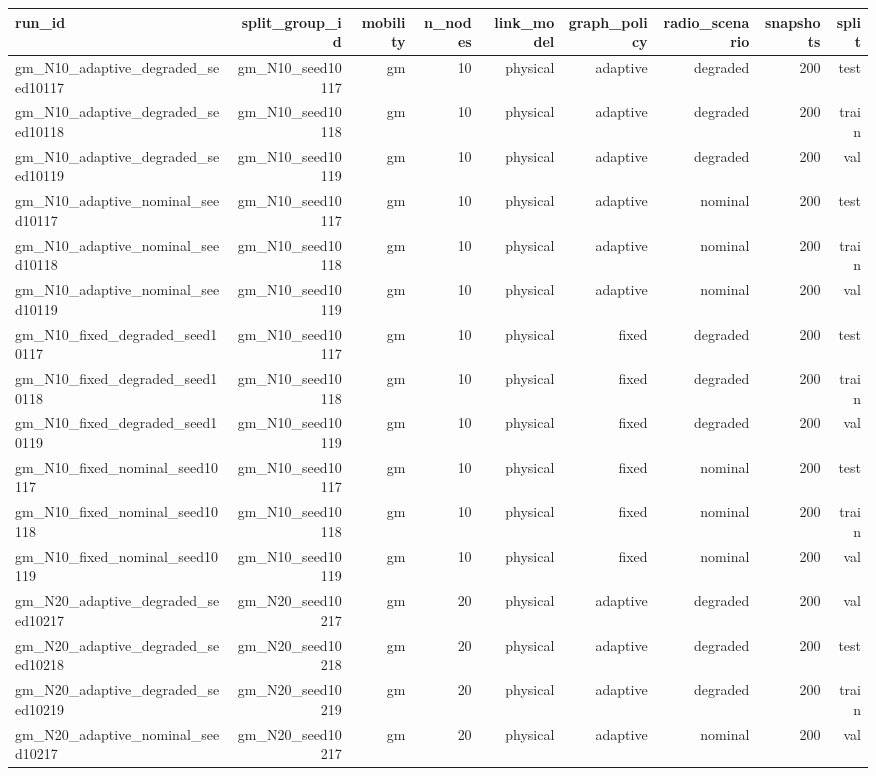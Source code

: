 \begin{tabular}{lrrrrrrrr}
\toprule
run\_id & split\_group\_id & mobility & n\_nodes & link\_model & graph\_policy & radio\_scenario & snapshots & split \\
\midrule
gm\_N10\_adaptive\_degraded\_seed10117 & gm\_N10\_seed10117 & gm & 10 & physical & adaptive & degraded & 200 & test \\
gm\_N10\_adaptive\_degraded\_seed10118 & gm\_N10\_seed10118 & gm & 10 & physical & adaptive & degraded & 200 & train \\
gm\_N10\_adaptive\_degraded\_seed10119 & gm\_N10\_seed10119 & gm & 10 & physical & adaptive & degraded & 200 & val \\
gm\_N10\_adaptive\_nominal\_seed10117 & gm\_N10\_seed10117 & gm & 10 & physical & adaptive & nominal & 200 & test \\
gm\_N10\_adaptive\_nominal\_seed10118 & gm\_N10\_seed10118 & gm & 10 & physical & adaptive & nominal & 200 & train \\
gm\_N10\_adaptive\_nominal\_seed10119 & gm\_N10\_seed10119 & gm & 10 & physical & adaptive & nominal & 200 & val \\
gm\_N10\_fixed\_degraded\_seed10117 & gm\_N10\_seed10117 & gm & 10 & physical & fixed & degraded & 200 & test \\
gm\_N10\_fixed\_degraded\_seed10118 & gm\_N10\_seed10118 & gm & 10 & physical & fixed & degraded & 200 & train \\
gm\_N10\_fixed\_degraded\_seed10119 & gm\_N10\_seed10119 & gm & 10 & physical & fixed & degraded & 200 & val \\
gm\_N10\_fixed\_nominal\_seed10117 & gm\_N10\_seed10117 & gm & 10 & physical & fixed & nominal & 200 & test \\
gm\_N10\_fixed\_nominal\_seed10118 & gm\_N10\_seed10118 & gm & 10 & physical & fixed & nominal & 200 & train \\
gm\_N10\_fixed\_nominal\_seed10119 & gm\_N10\_seed10119 & gm & 10 & physical & fixed & nominal & 200 & val \\
gm\_N20\_adaptive\_degraded\_seed10217 & gm\_N20\_seed10217 & gm & 20 & physical & adaptive & degraded & 200 & val \\
gm\_N20\_adaptive\_degraded\_seed10218 & gm\_N20\_seed10218 & gm & 20 & physical & adaptive & degraded & 200 & test \\
gm\_N20\_adaptive\_degraded\_seed10219 & gm\_N20\_seed10219 & gm & 20 & physical & adaptive & degraded & 200 & train \\
gm\_N20\_adaptive\_nominal\_seed10217 & gm\_N20\_seed10217 & gm & 20 & physical & adaptive & nominal & 200 & val \\

\end{tabular}
